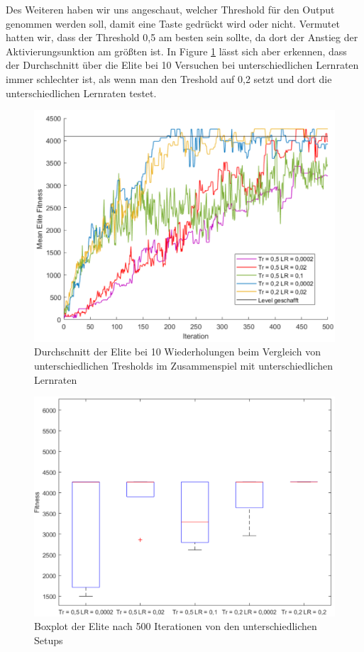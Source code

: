 \documentclass{hbrs-ecta-report}
\begin{document}
Des Weiteren haben wir uns angeschaut,  welcher Threshold für den Output genommen werden soll, damit eine Taste gedrückt wird oder nicht. Vermutet hatten wir, dass der Threshold 0,5 am besten sein sollte, da dort der Anstieg der Aktivierungsunktion am größten ist. In Figure \ref{fig:treshold} lässt sich aber erkennen, dass der Durchschnitt über die Elite bei 10 Versuchen bei unterschiedlichen Lernraten immer schlechter ist, als wenn man den Treshold auf 0,2 setzt und dort die unterschiedlichen Lernraten testet. 
\begin{figure}[ht!]
	\centering
	\includegraphics[width=\linewidth]{img/Mario_Treshold.png}
	\caption{Durchschnitt der Elite bei 10 Wiederholungen beim Vergleich von unterschiedlichen Tresholds im Zusammenspiel mit unterschiedlichen Lernraten}
	\label{fig:treshold} 
\end{figure}

\begin{figure}[ht!]
	\centering
	\includegraphics[width=\linewidth]{img/Mario_Treshold_boxplot.png}
	\caption{Boxplot der Elite nach 500 Iterationen von den unterschiedlichen Setups}
	\label{fig:treshold_boxplot} 
\end{figure}
\end{document}
